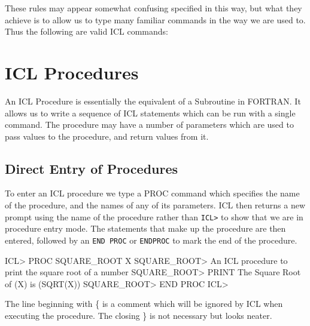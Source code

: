 \documentclass[twoside,11pt,nolof,chapters]{starlink}
\begin{document}
These rules may appear somewhat confusing specified in this way, but what
they achieve is to allow us to type many familiar commands in the way
we are used to. Thus the following are valid ICL commands:


\chapter{ICL Procedures\label{icl_procedures}}
An ICL Procedure is essentially the equivalent of a Subroutine in FORTRAN.
It allows us to write a sequence of ICL statements which can be run with
a single command. The procedure may have a number of parameters which are
used to pass values to the procedure, and return values from it.
\section{\xlabel{direct_entry_of_procedures}Direct Entry of Procedures}
To enter an ICL procedure we type a PROC command which specifies the name
of the procedure, and the names of any of its parameters. ICL then returns
a new prompt using the name of the procedure rather than \verb+ICL>+ to show
that we are in procedure entry mode. The statements that make up the procedure
are then entered, followed by an \verb+END PROC+ or \verb+ENDPROC+ to mark the
end of the procedure.
\begin{terminalv}
    ICL> PROC SQUARE_ROOT X
    SQUARE_ROOT> {  An ICL procedure to print the square root of a number  }
    SQUARE_ROOT> PRINT The Square Root of (X) is (SQRT(X))
    SQUARE_ROOT> END PROC
    ICL>
\end{terminalv}
The line beginning with \{ is a comment which will be ignored by ICL when
executing the procedure. The closing \} is not necessary but looks neater.
\end{document}

